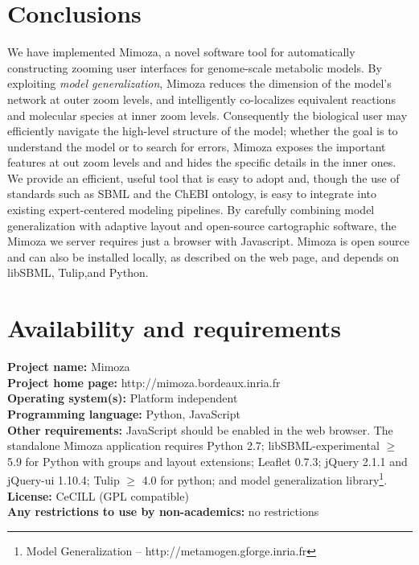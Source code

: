 \documentclass{bmcart}
\begin{document}

\section*{Conclusions}
We have implemented Mimoza, a novel software tool for automatically constructing zooming
user interfaces for genome-scale metabolic models. 
By exploiting \emph{model generalization}, Mimoza reduces
the dimension of the model's network at outer zoom levels, and intelligently co-localizes
equivalent reactions and molecular species at inner zoom levels.
Consequently the biological user may efficiently navigate the high-level structure of the
model; whether the goal is to understand the model or to search for errors, Mimoza exposes
the important features at out zoom levels and and hides the specific details in the inner
ones.
We provide an efficient, useful  tool that is easy to adopt and, though the use of
standards such as SBML and the ChEBI ontology, is easy to integrate into existing
expert-centered modeling pipelines.
By carefully combining model generalization with adaptive layout and open-source
cartographic software, the Mimoza we server requires just a browser with Javascript. 
Mimoza is open source and can also be installed locally, as described on the web page,
and depends on libSBML, Tulip,and Python.

\section*{Availability and requirements}
\textbf{Project name:} Mimoza\\
\textbf{Project home page:} http://mimoza.bordeaux.inria.fr\\
\textbf{Operating system(s):} Platform independent\\
\textbf{Programming language:} Python, JavaScript\\
\textbf{Other requirements:} JavaScript should be enabled in the web browser. The
standalone Mimoza application requires Python 2.7; libSBML-experimental $\geq$ 5.9 for
Python with groups and layout extensions; Leaflet 0.7.3; jQuery 2.1.1 and jQuery-ui
1.10.4; Tulip $\geq$ 4.0 for python; and model generalization library\footnote{Model Generalization -- http://metamogen.gforge.inria.fr}.\\
\textbf{License:} CeCILL (GPL compatible)\\
\textbf{Any restrictions to use by non-academics:} no restrictions
\end{document}

